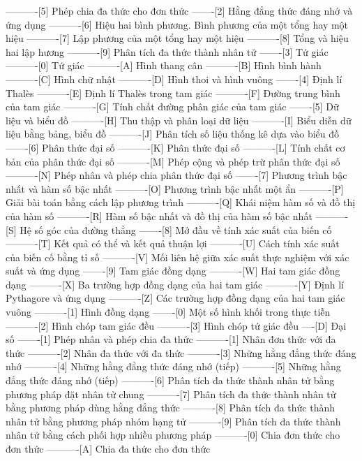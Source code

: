 ----------[5] Phép chia đa thức cho đơn thức
-------[2] Hằng đẳng thức đáng nhớ và ứng dụng
----------[6] Hiệu hai bình phương. Bình phương của một tổng hay một hiệu
----------[7] Lập phương của một tổng hay một hiệu
----------[8] Tổng và hiệu hai lập hương
----------[9] Phân tích đa thức thành nhân tử
-------[3] Tứ giác
----------[0] Tứ giác
----------[A] Hình thang cân
----------[B] Hình bình hành
----------[C] Hình chữ nhật
----------[D] Hình thoi và hình vuông
-------[4] Định lí Thalès
----------[E] Định lí Thalès trong tam giác
----------[F] Đường trung bình của tam giác
----------[G] Tính chất đường phân giác của tam giác
-------[5] Dữ liệu và biểu đồ
----------[H] Thu thập và phân loại dữ liệu
----------[I] Biểu diễn dữ liệu bằng bảng, biểu đồ
----------[J] Phân tích số liệu thống kê dựa vào biểu đồ
-------[6] Phân thức đại số
----------[K] Phân thức đại số
----------[L] Tính chất cơ bản của phân thức đại số
----------[M] Phép cộng và phép trừ phân thức đại số
----------[N] Phép nhân và phép chia phân thức đại số
-------[7] Phương trình bậc nhất và hàm số bậc nhất
----------[O] Phương trình bậc nhất một ẩn
----------[P] Giải bài toán bằng cách lập phương trình
----------[Q] Khái niệm hàm số và đồ thị của hàm số
----------[R] Hàm số bậc nhất và đồ thị của hàm số bậc nhất
----------[S] Hệ số góc của đường thẳng
-------[8] Mở đầu về tính xác suất của biến cố
----------[T] Kết quả có thể và kết quả thuận lợi
----------[U] Cách tính xác suất của biến cố bằng tỉ số
----------[V] Mối liên hệ giữa xác suất thực nghiệm với xác suất và ứng dụng
-------[9] Tam giác đồng dạng
----------[W] Hai tam giác đồng dạng
----------[X] Ba trường hợp đồng dạng của hai tam giác
----------[Y] Định lí Pythagore và ứng dụng
----------[Z] Các trường hợp đồng dạng của hai tam giác vuông
----------[1] Hình đồng dạng
-------[0] Một số hình khối trong thực tiễn
----------[2] Hình chóp tam giác đều
----------[3] Hình chóp tứ giác đều
----[D] Đại số
-------[1] Phép nhân và phép chia đa thức
----------[1] Nhân đơn thức với đa thức
----------[2] Nhân đa thức với đa thức
----------[3] Những hằng đẳng thức đáng nhớ
----------[4] Những hằng đẳng thức đáng nhớ (tiếp)
----------[5] Những hằng đẳng thức đáng nhớ (tiếp)
----------[6] Phân tích đa thức thành nhân tử bằng phương pháp đặt nhân tử chung
----------[7] Phân tích đa thức thành nhân tử bằng phương pháp dùng hằng đẳng thức
----------[8] Phân tích đa thức thành nhân tử bằng phương pháp nhóm hạng tử
----------[9] Phân tích đa thức thành nhân tử bằng cách phối hợp nhiều phương pháp
----------[0] Chia đơn thức cho đơn thức
----------[A] Chia đa thức cho đơn thức
